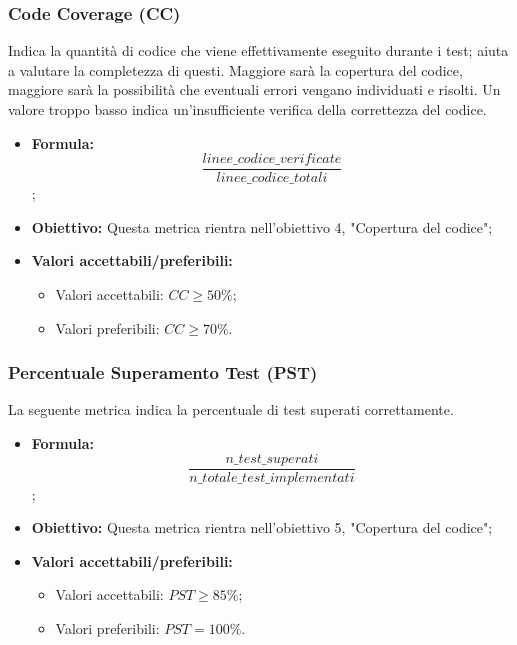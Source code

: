 \subsubsection{Code Coverage (CC)}
Indica la quantità di codice che viene effettivamente eseguito durante i test; aiuta a valutare la completezza di questi. Maggiore sarà la copertura del codice, maggiore sarà la possibilità che eventuali errori vengano individuati e risolti. Un valore troppo basso indica un'insufficiente verifica della correttezza del codice.
\begin{itemize}
	\item \textbf{Formula:} \[\frac{linee\_codice\_verificate}{linee\_codice\_totali}\];
	\item \textbf{Obiettivo:} Questa metrica rientra nell'obiettivo 4, "Copertura del codice";
	\item \textbf{Valori accettabili/preferibili: }
	\begin{itemize}
		\item Valori accettabili: $CC \geq 50\%$;
		\item Valori preferibili: $CC \geq 70\%$.
	\end{itemize}
\end{itemize}


\subsubsection{Percentuale Superamento Test (PST)}
La seguente metrica indica la percentuale di test superati correttamente.
\begin{itemize}
	\item \textbf{Formula:} \[\frac{n\_test\_superati}{n\_totale\_test\_implementati}\];
	\item \textbf{Obiettivo:} Questa metrica rientra nell'obiettivo 5, "Copertura del codice";
	\item \textbf{Valori accettabili/preferibili: }
	\begin{itemize}
		\item Valori accettabili: $PST \geq 85\%$;
		\item Valori preferibili: $PST = 100\%$.
	\end{itemize}
\end{itemize}



